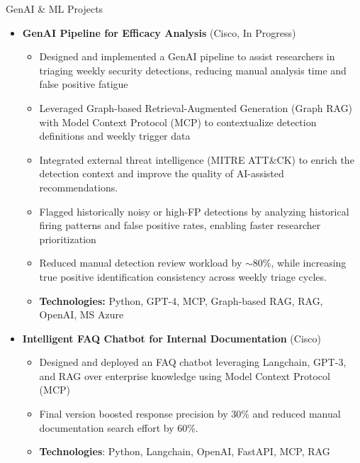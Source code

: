 \documentclass{resume} %
\begin{document}
\begin{rSection}{GenAI \& ML Projects}

        \begin{itemize}

            \item \textbf{GenAI Pipeline for Efficacy Analysis} (Cisco, In Progress)
            \begin{itemize}
                \item Designed and implemented a GenAI pipeline to assist researchers in triaging weekly security detections, reducing manual analysis time and false positive fatigue
                \item Leveraged Graph-based Retrieval-Augmented Generation (Graph RAG) with Model Context Protocol (MCP) to contextualize detection definitions and weekly trigger data
                \item Integrated external threat intelligence (MITRE ATT\&CK) to enrich the detection context and improve the quality of AI-assisted recommendations.
                \item Flagged historically noisy or high-FP detections by analyzing historical firing patterns and false positive rates, enabling faster researcher prioritization
                \item Reduced manual detection review workload by \(\sim \)80\%, while increasing true positive identification consistency across weekly triage cycles.
                \item \textbf{Technologies:} Python, GPT-4, MCP, Graph-based RAG, RAG, OpenAI, MS Azure
            \end{itemize}
        
            \item \textbf{Intelligent FAQ Chatbot for Internal Documentation} (Cisco)
                \begin{itemize}
                    \item Designed and deployed an FAQ chatbot leveraging Langchain, GPT-3, and RAG over enterprise knowledge using Model Context Protocol (MCP)
                    \item Final version boosted response precision by 30\% and reduced manual documentation search effort by 60\%.
                    \item \textbf{Technologies}: Python, Langchain, OpenAI, FastAPI, MCP, RAG
                \end{itemize}


\end{itemize}
\end{rSection}
\end{document}
